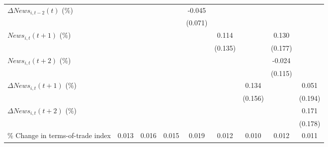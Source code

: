 {\begin{tabular}{l*{8}{c}}
\addlinespace
$ \Delta News_{i,t-2}(t)$ (\%)&                     &                     &                     &      -0.045         &                     &                     &                     &                     \\
                    &                     &                     &                     &     (0.071)         &                     &                     &                     &                     \\
\addlinespace
$ News_{i,t}(t+1)$ (\%)&                     &                     &                     &                     &       0.114         &                     &       0.130         &                     \\
                    &                     &                     &                     &                     &     (0.135)         &                     &     (0.177)         &                     \\
\addlinespace
$ News_{i,t}(t+2)$ (\%)&                     &                     &                     &                     &                     &                     &      -0.024         &                     \\
                    &                     &                     &                     &                     &                     &                     &     (0.115)         &                     \\
\addlinespace
$ \Delta News_{i,t}(t+1)$ (\%)&                     &                     &                     &                     &                     &       0.134         &                     &       0.051         \\
                    &                     &                     &                     &                     &                     &     (0.156)         &                     &     (0.194)         \\
\addlinespace
$ \Delta News_{i,t}(t+2)$ (\%)&                     &                     &                     &                     &                     &                     &                     &       0.171         \\
                    &                     &                     &                     &                     &                     &                     &                     &     (0.178)         \\
\addlinespace
\% Change in terms-of-trade index&       0.013         &       0.016         &       0.015         &       0.019         &       0.012         &       0.010         &       0.012         &       0.011         \\

\end{tabular}}
